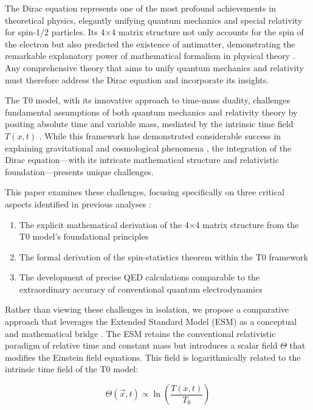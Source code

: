 \documentclass[12pt,a4paper]{article}
\newcommand{\Tfieldt}{T(x,t)}
\newcommand{\Tzero}{T_0}
\newcommand{\vecx}{\vec{x}}
\begin{document}
	The Dirac equation represents one of the most profound achievements in theoretical physics, elegantly unifying quantum mechanics and special relativity for spin-1/2 particles. Its 4$\times$4 matrix structure not only accounts for the spin of the electron but also predicted the existence of antimatter, demonstrating the remarkable explanatory power of mathematical formalism in physical theory \cite{dirac1928}. Any comprehensive theory that aims to unify quantum mechanics and relativity must therefore address the Dirac equation and incorporate its insights.
	
	The T0 model, with its innovative approach to time-mass duality, challenges fundamental assumptions of both quantum mechanics and relativity theory by positing absolute time and variable mass, mediated by the intrinsic time field $\Tfieldt$ \cite{pascher_part1_2025, pascher_quantum_2025}. While this framework has demonstrated considerable success in explaining gravitational and cosmological phenomena \cite{pascher_emergente_2025, pascher_galaxies_2025}, the integration of the Dirac equation—with its intricate mathematical structure and relativistic foundation—presents unique challenges.
	
	This paper examines these challenges, focusing specifically on three critical aspects identified in previous analyses \cite{pascher_pragmatic_2025}:
	
	\begin{enumerate}
		\item The explicit mathematical derivation of the 4$\times$4 matrix structure from the T0 model's foundational principles
		\item The formal derivation of the spin-statistics theorem within the T0 framework
		\item The development of precise QED calculations comparable to the extraordinary accuracy of conventional quantum electrodynamics
	\end{enumerate}
	
	Rather than viewing these challenges in isolation, we propose a comparative approach that leverages the Extended Standard Model (ESM) as a conceptual and mathematical bridge \cite{pascher_standardmod_2025, pascher_esm_comparison_2025}. The ESM retains the conventional relativistic paradigm of relative time and constant mass but introduces a scalar field $\Theta$ that modifies the Einstein field equations. This field is logarithmically related to the intrinsic time field of the T0 model:
	
	\begin{equation}
		\Theta(\vecx,t) \propto \ln\left(\frac{\Tfieldt}{\Tzero}\right)
	\end{equation}
	
\end{document}
